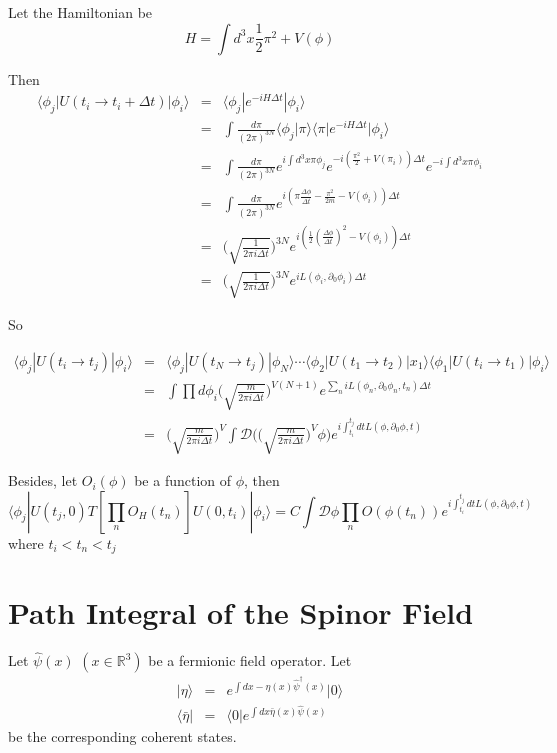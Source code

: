 \documentclass[12pt]{book}
\begin{document}
	Let the Hamiltonian be 
	\begin{equation}
		H=\int d^3x\frac 12 \pi^2+V(\phi)
	\end{equation}
	
	Then
	\begin{eqnarray}
		\langle \phi_j|U(t_i\rightarrow t_i+\Delta t)|\phi_i\rangle&=&\langle \phi_j|e^{-iH\Delta t}|\phi_i\rangle\\
		&=&\int\frac {d\pi}{(2\pi)^{3N}}\langle \phi_j|\pi\rangle\langle \pi|e^{-iH\Delta t}|\phi_i\rangle\\
		&=&\int\frac {d\pi}{(2\pi)^{3N}}e^{i\int d^3x\pi \phi_j}e^{-i(\frac {\pi^2}{2}+V(\pi_i))\Delta t}e^{-i\int d^3x \pi \phi_i}\\
		&=&\int\frac {d\pi}{(2\pi)^{3N}}e^{i(\pi\frac {\Delta \phi}{\Delta t}-\frac {\pi^2}{2m}-V(\phi_i))\Delta t}\\
		&=&\bigg(\sqrt{\frac1{2\pi i\Delta t}}\bigg)^{3N}e^{i(\frac 12(\frac{\Delta \phi}{\Delta t})^2-V(\phi_i))\Delta t}\\
		&=&\bigg(\sqrt{\frac1{2\pi i\Delta t}}\bigg)^{3N}e^{iL(\phi_i,\partial_0 \phi_i)\Delta t}
	\end{eqnarray}
	
	So
	
	\begin{eqnarray}
		\langle \phi_j|U(t_i\rightarrow t_j)|\phi_i\rangle&=& \langle \phi_j|U(t_N\rightarrow t_j)|\phi_N\rangle\cdots \langle \phi_2|U(t_1 \rightarrow t_2)|x_1\rangle \langle \phi_1|U(t_i \rightarrow t_1)|\phi_i\rangle\\
		&=&\int\prod d\phi_i\bigg(\sqrt{\frac{m}{2\pi i\Delta t}}\bigg)^{V(N+1)}e^{\sum_n iL( \phi_n,\partial_0  \phi_n,t_n)\Delta t}\\
		&=&\bigg(\sqrt{\frac{m}{2\pi i\Delta t}}\bigg)^V\int \mathcal D\bigg(\bigg(\sqrt{\frac{m}{2\pi i\Delta t}}\bigg)^V\phi\bigg)e^{i\int_{t_i}^{t_j}dtL(\phi,\partial_0 \phi,t)}
	\end{eqnarray}
	
	Besides, let $O_i(\phi)$ be a function of $\phi$, then
	\begin{equation}
		\langle \phi_j|U(t_j,0)T[\prod_nO_H(t_n)]U(0,t_i)|\phi_i\rangle=C\int \mathcal D \phi\prod_n O(\phi(t_n))e^{i\int_{t_i}^{t_j}dtL(\phi,\partial_0 \phi,t)}
	\end{equation}
	where $t_i<t_n<t_j$
	
	\section{Path Integral of the Spinor Field}
	Let $\hat\psi(x)$ $(x\in\mathbb R^3)$ be a fermionic field operator. Let
	\begin{eqnarray}
		|\eta\rangle&=&e^{\int dx-\eta(x)\hat\psi^\dagger(x)}|0\rangle\\
		\langle\bar\eta|&=&\langle0|e^{\int dx\bar\eta(x)\hat\psi(x)}
	\end{eqnarray}
	be the corresponding coherent states.
	
\end{document}
